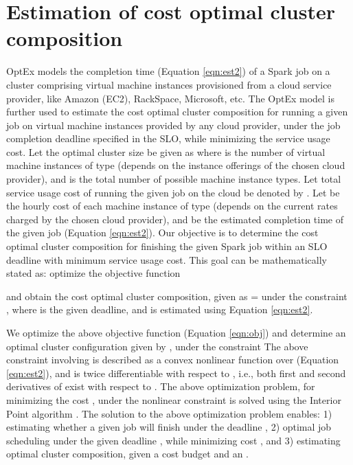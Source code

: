 \documentclass[conference]{IEEEtran}
\begin{document}
\section{Estimation of cost optimal cluster composition}\label{sec:cost}


OptEx models the completion time  (Equation
\ref{eqn:est2}) of a Spark job on a cluster comprising virtual machine instances provisioned
 from a cloud service provider, like Amazon (EC2), RackSpace, Microsoft, etc. The OptEx model is further used to estimate the cost optimal cluster composition for running a given job on
  virtual machine instances provided by any cloud provider, under
the job completion deadline specified in the SLO, while minimizing the service usage cost.
 Let the optimal cluster size be given as 
 where  is the number of virtual machine instances of type  (depends on the instance offerings of the chosen cloud provider), and   is the total number of possible machine instance types.
Let total service usage cost of running the given job on the cloud be denoted by .
Let  be the hourly cost of each
 machine instance of type  (depends on the current rates charged by the chosen cloud provider), and  be the estimated
 completion time of the given job (Equation \ref{eqn:est2}).
   Our objective is to determine the
 cost optimal cluster composition for finishing the given Spark job within an SLO deadline with minimum service usage cost.
  This goal can be mathematically stated as: optimize the objective function

and  obtain the cost optimal cluster composition, given as  =  under
the constraint , where  is the given deadline, and
  is estimated using Equation \ref{eqn:est2}.
\par We optimize the above objective function (Equation \ref{eqn:obj}) and determine an optimal cluster configuration given by , under the constraint 
The above constraint involving  is described as a convex  nonlinear function over  (Equation
\ref{eqn:est2}), and is twice differentiable with
respect to , i.e., both first and second derivatives of  exist with respect to .
The above optimization problem, for minimizing the cost , under the nonlinear constraint  is solved using the Interior Point algorithm \cite{leader2004numerical}.
 The solution to the
above optimization problem enables: 1) estimating whether a
given job will finish under the deadline , 2) optimal job
scheduling under the given deadline , while minimizing
cost , and 3) estimating optimal cluster
composition, given a cost budget  and an .  
\end{document}
